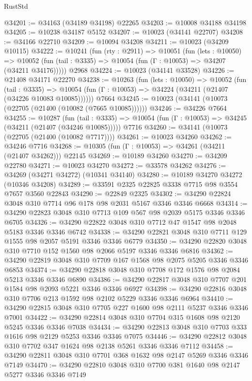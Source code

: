 \begin{lexlean}{RustStd}
\begin{coremodule}
@34201 := @34163 (@34189 @34198) @22265
@34203 := @10008 @34188 @34198
@34205 := @10238 @34187 @5152
@34207 := @10023 (@34141 @22707)
@34208 := @34166 @22710
@34209 := @10094 @34208
@34211 := @10023 (@34209 @10115)
@34222 := @10241
    (fun (rty : @2911) =>
    @10051
      (fun (lets : @10050) =>
      @10052 (fun (tail : @3335) => @10054 (fun (Γ : @10053) => @34207 (@34211 @34176)))))
    @2968
@34224 := @10023 (@34141 @33528)
@34226 := @21408 @34171 @22270
@34238 := @10263
    (fun (lets : @10050) =>
    @10052
      (fun (tail : @3335) =>
      @10054 (fun (Γ : @10053) => @34224 (@34211 (@21407 (@34226 @10083 @10085))))))
    @7664
@34245 := @10023 (@34141 (@10073 (@22705 (@21400 (@10082 (@7665 @10085))))))
@34246 := @34226 @7664
@34255 := @10287
    (fun (tail : @3335) => @10054 (fun (Γ : @10053) => @34245 (@34211 (@21407 (@34246 @10085)))))
    @7716
@34260 := @34141 (@10073 (@22705 (@21400 (@10082 @7717))))
@34261 := @10023 @34260
@34262 := @34246 @7716
@34268 := @10305 (fun (Γ : @10053) => @34261 (@34211 (@21407 @34262))) @22145
@34269 := @10189 @34260
@34270 := @34209 @22780
@34271 := @10023 @34270
@34272 := @33578 @34262
@34276 := @34269 (@34271 @34272) (@10341 @34140)
@34280 := @10189 @34270 @34272 (@10346 @34208)
@34289 := @33591 @2325 @22825 @3338 @7715 @98 @3554 @7657 @3560 @22843
@34290 := @22849 @2325
@34302 := @34290 @22824 @3048 @310 @7714 @96 @178 @98 @2031 @5167 @3346 @3346 @6668
@34314 := @34290 @22823 @3048 @310 @7713 @109 @567 @98 @2039 @5175 @3346 @3346 @6705
@34326 := @34290 @22822 @3048 @310 @7712 @47 @1547 @98 @2048 @5183 @3346 @3346 @6742
@34338 := @34290 @22821 @3048 @310 @7711 @129 @1555 @98 @2057 @5191 @3346 @3346 @6779
@34350 := @34290 @22820 @3048 @310 @7710 @152 @1560 @98 @2066 @5197 @3346 @3346 @6816
@34362 := @34290 @22819 @3048 @310 @7709 @167 @1568 @98 @2075 @5205 @3346 @3346 @6853
@34374 := @34290 @22818 @3048 @310 @7708 @172 @1576 @98 @2084 @5213 @3346 @3346 @6890
@34386 := @34290 @22817 @3048 @310 @7707 @201 @1584 @98 @2093 @5221 @3346 @3346 @6927
@34398 := @34290 @22816 @3048 @310 @7706 @213 @1592 @98 @2102 @5229 @3346 @3346 @6964
@34410 := @34290 @22815 @3048 @310 @7705 @227 @1600 @98 @2111 @5237 @3346 @3346 @7001
@34422 := @34290 @22814 @3048 @310 @7704 @315 @1608 @98 @2120 @5245 @3346 @3346 @7038
@34434 := @34290 @22813 @3048 @310 @7703 @333 @1616 @98 @2129 @5253 @3346 @3346 @7075
@34446 := @34290 @22812 @3048 @310 @7702 @347 @1624 @98 @2138 @5261 @3346 @3346 @7112
@34458 := @34290 @22811 @3048 @310 @7701 @368 @1632 @98 @2147 @5269 @3346 @3346 @7149
@34470 := @34290 @22810 @3048 @310 @7700 @381 @1640 @98 @2147 @5277 @3346 @3346 @7149

\end{coremodule}
\end{lexlean}
